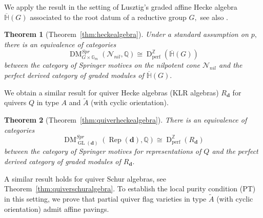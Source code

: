 \documentclass{amsart}
\theoremstyle{plain}
\newtheorem*{theorem*}{Theorem}
\theoremstyle{TheoremNum}
\theoremstyle{definition}
\theoremstyle{remark}
\numberwithin{equation}{section}
\newcommand{\Q}{\mathbb{Q}}
\newcommand{\Z}{\mathbb{Z}}
\newcommand{\Nnil}{\mathcal{N}_{nil}}
\newcommand{\DM}{\operatorname{DM}}
\newcommand{\DperfZ}{\operatorname{D}^\Z_{\operatorname{perf}}}
\newcommand{\GL}{\operatorname{GL}}
\newcommand{\Rep}{\operatorname{Rep}}
\begin{document}
We apply the result in the setting of Lusztig's graded affine Hecke algebra $\overline{\mathbb{H}}(G)$ associated to the root datum of a reductive group $G,$ see also \cite{eberhardt_springer_2021}.
\begin{theorem*}[Theorem~\ref{thm:heckealgebra}]
Under a standard assumption on $p,$ there is an equivalence of categories
$$\DM^{Spr}_{G\times\mathbb{G}_m}(\Nnil,\Q)\cong \DperfZ(\overline{\mathbb{H}}(G))$$
between the category of Springer motives on the nilpotent cone $\Nnil$ and the perfect derived category of graded modules of $\overline{\mathbb{H}}(G).$
\end{theorem*}
We obtain a similar result for quiver Hecke algebras (KLR algebras) $R_\mathbf{d}$ for quivers $Q$ in type $A$ and $\widetilde{A}$ (with cyclic orientation).
\begin{theorem*}[Theorem~\ref{thm:quiverheckealgebra}]
There is an equivalence of categories
$$\DM^{Spr}_{\GL(\mathbf{d})}(\Rep(\mathbf{d}),\Q)\cong \DperfZ(R_\mathbf{d})$$
between the category of Springer motives for representations of $Q$ and the perfect derived category of graded modules of $R_\mathbf{d}.$
\end{theorem*}
A similar result holds for quiver Schur algebras, see Theorem~\ref{thm:quiverschuralgebra}. To establish the local purity condition (PT) in this setting, we prove that partial quiver flag varieties in type $\widetilde{A}$ (with cyclic orientation) admit affine pavings.
\end{document}
